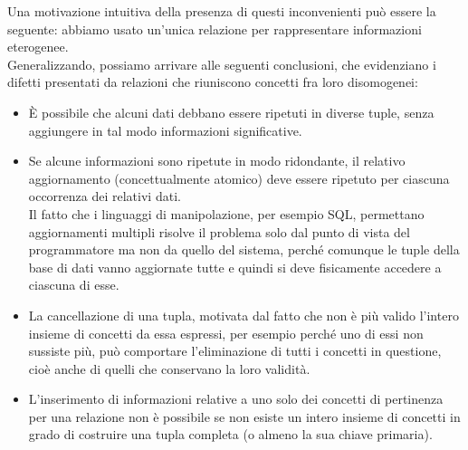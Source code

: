Una motivazione intuitiva della presenza di questi inconvenienti può essere la seguente: abbiamo usato un'unica relazione per rappresentare informazioni eterogenee.\\
Generalizzando, possiamo arrivare alle seguenti conclusioni, che evidenziano i difetti presentati da relazioni che riuniscono concetti fra loro disomogenei:
    \begin{itemize}
        \item{È possibile che alcuni dati debbano essere ripetuti in diverse tuple, senza aggiungere in tal modo informazioni significative.}
        \item{Se alcune informazioni sono ripetute in modo ridondante, il relativo aggiornamento (concettualmente atomico) deve essere ripetuto per ciascuna occorrenza dei relativi dati.\\
        Il fatto che i linguaggi di manipolazione, per esempio SQL, permettano aggiornamenti multipli risolve il problema solo dal punto di vista del programmatore ma non da quello del sistema, perché comunque le tuple della base di dati vanno aggiornate tutte e quindi si deve fisicamente accedere a ciascuna di esse.}
        \item{La cancellazione di una tupla, motivata dal fatto che non è più valido l'intero insieme di concetti da essa espressi, per esempio perché uno di essi non sussiste più, può comportare l'eliminazione di tutti i concetti in questione, cioè anche di quelli che conservano la loro validità.}
        \item{L'inserimento di informazioni relative a uno solo dei concetti di pertinenza per una relazione non è possibile se non esiste un intero insieme di concetti in grado di costruire una tupla completa (o almeno la sua chiave primaria).}
    \end{itemize}

